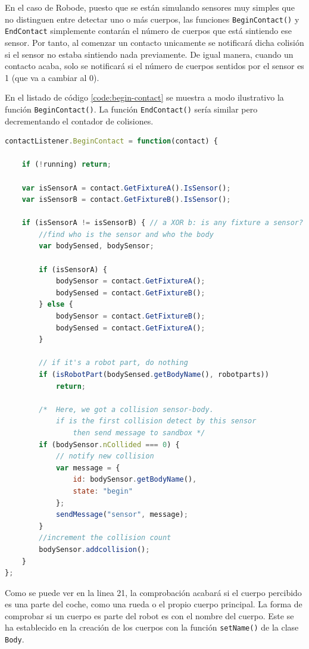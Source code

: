 En el caso de Robode, puesto que se están simulando sensores muy simples que no distinguen entre detectar uno o más cuerpos, las funciones \texttt{BeginContact()} y \texttt{EndContact} simplemente contarán el número de cuerpos que está sintiendo ese sensor. Por tanto, al comenzar un contacto unicamente se notificará dicha colisión si el sensor no estaba sintiendo nada previamente. De igual manera, cuando un contacto acaba, solo se notificará si el número de cuerpos sentidos por el sensor es 1 (que va a cambiar al 0).

En el listado de código \ref{code:begin-contact} se muestra a modo ilustrativo la función \texttt{BeginContact()}. La función \texttt{EndContact()} sería similar pero decrementando el contador de colisiones.


\begin{lstlisting}[language={Javascript},label={code:begin-contact}, caption={Función \texttt{BeginContact()} definida para los sensores.}]
contactListener.BeginContact = function(contact) {

	if (!running) return;

	var isSensorA = contact.GetFixtureA().IsSensor();
	var isSensorB = contact.GetFixtureB().IsSensor();

	if (isSensorA != isSensorB) { // a XOR b: is any fixture a sensor?
		//find who is the sensor and who the body
		var bodySensed, bodySensor;

		if (isSensorA) {
			bodySensor = contact.GetFixtureA();
			bodySensed = contact.GetFixtureB();
		} else {
			bodySensor = contact.GetFixtureB();
			bodySensed = contact.GetFixtureA();
		}

		// if it's a robot part, do nothing
		if (isRobotPart(bodySensed.getBodyName(), robotparts))
			return;

		/*  Here, we got a collision sensor-body.
			if is the first collision detect by this sensor
				then send message to sandbox */
		if (bodySensor.nCollided === 0) {
			// notify new collision
			var message = {
				id: bodySensor.getBodyName(),
				state: "begin"
			};
			sendMessage("sensor", message);
		}
		//increment the collision count
		bodySensor.addcollision();
	}
};
\end{lstlisting}

Como se puede ver en la linea 21, la comprobación acabará si el cuerpo percibido es una parte del coche, como una rueda o el propio cuerpo principal. La forma de comprobar si un cuerpo es parte del robot es con el nombre del cuerpo. Este se ha establecido en la creación de los cuerpos con la función \texttt{setName()} de la clase \texttt{Body}.

